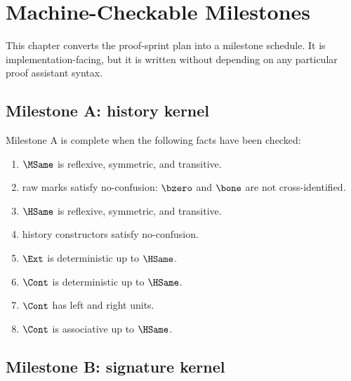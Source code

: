 \chapter{Machine-Checkable Milestones}
\label{ch:hardening-machine-checkable-milestones}

This chapter converts the proof-sprint plan into a milestone schedule. It is implementation-facing, but it is written without depending on any particular proof assistant syntax.

\section{Milestone A: history kernel}

\begin{protocol}[Milestone A]
Milestone A is complete when the following facts have been checked:
\begin{enumerate}
  \item \(\MSame\) is reflexive, symmetric, and transitive.
  \item raw marks satisfy no-confusion: \(\bzero\) and \(\bone\) are not cross-identified.
  \item \(\HSame\) is reflexive, symmetric, and transitive.
  \item history constructors satisfy no-confusion.
  \item \(\Ext\) is deterministic up to \(\HSame\).
  \item \(\Cont\) is deterministic up to \(\HSame\).
  \item \(\Cont\) has left and right units.
  \item \(\Cont\) is associative up to \(\HSame\).
\end{enumerate}
\end{protocol}

\section{Milestone B: signature kernel}

